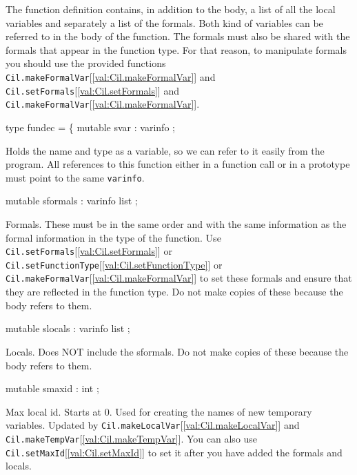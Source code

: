 \documentclass[11pt]{article}
\begin{document}
 The function definition contains, in addition to the body, a list of all the
local variables and separately a list of the formals. Both kind of variables
can be referred to in the body of the function. The formals must also be shared
with the formals that appear in the function type. For that reason, to
manipulate formals you should use the provided functions
{\tt{Cil.makeFormalVar}}[\ref{val:Cil.makeFormalVar}] and {\tt{Cil.setFormals}}[\ref{val:Cil.setFormals}] and {\tt{Cil.makeFormalVar}}[\ref{val:Cil.makeFormalVar}].



\label{type:Cil.fundec}\begin{ocamldoccode}
type fundec = \{
  mutable svar : varinfo ;
\end{ocamldoccode}
\begin{ocamldoccomment}
Holds the name and type as a variable, so we can refer to it 
 easily from the program. All references to this function either 
 in a function call or in a prototype must point to the same 
 {\tt{varinfo}}.
\end{ocamldoccomment}
\begin{ocamldoccode}
  mutable sformals : varinfo list ;
\end{ocamldoccode}
\begin{ocamldoccomment}
Formals. These must be in the same order and with the same 
 information as the formal information in the type of the function. 
 Use {\tt{Cil.setFormals}}[\ref{val:Cil.setFormals}] or 
 {\tt{Cil.setFunctionType}}[\ref{val:Cil.setFunctionType}] or {\tt{Cil.makeFormalVar}}[\ref{val:Cil.makeFormalVar}] 
 to set these formals and ensure that they 
 are reflected in the function type. Do not make copies of these 
 because the body refers to them.
\end{ocamldoccomment}
\begin{ocamldoccode}
  mutable slocals : varinfo list ;
\end{ocamldoccode}
\begin{ocamldoccomment}
Locals. Does NOT include the sformals. Do not make copies of 
 these because the body refers to them.
\end{ocamldoccomment}
\begin{ocamldoccode}
  mutable smaxid : int ;
\end{ocamldoccode}
\begin{ocamldoccomment}
Max local id. Starts at 0. Used for 
 creating the names of new temporary 
 variables. Updated by 
 {\tt{Cil.makeLocalVar}}[\ref{val:Cil.makeLocalVar}] and 
 {\tt{Cil.makeTempVar}}[\ref{val:Cil.makeTempVar}]. You can also use 
 {\tt{Cil.setMaxId}}[\ref{val:Cil.setMaxId}] to set it after you 
 have added the formals and locals.
\end{ocamldoccomment}
\end{document}
